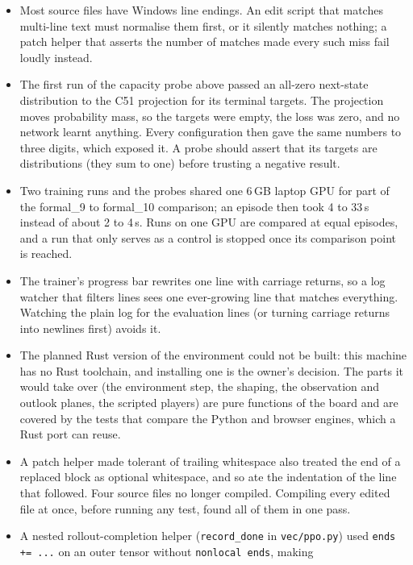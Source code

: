 \begin{itemize}
  \item Most source files have Windows line endings. An edit script that matches multi-line text
        must normalise them first, or it silently matches nothing; a patch helper that asserts the
        number of matches made every such miss fail loudly instead.
  \item The first run of the capacity probe above passed an all-zero next-state distribution to
        the C51 projection for its terminal targets. The projection moves probability mass, so
        the targets were empty, the loss was zero, and no network learnt anything. Every
        configuration then gave the same numbers to three digits, which exposed it. A probe
        should assert that its targets are distributions (they sum to one) before trusting a
        negative result.
  \item Two training runs and the probes shared one 6\,GB laptop GPU for part of the formal\_9 to
        formal\_10 comparison; an episode then took 4 to 33\,s instead of about 2 to 4\,s. Runs on
        one GPU are compared at equal episodes, and a run that only serves as a control is stopped
        once its comparison point is reached.
  \item The trainer's progress bar rewrites one line with carriage returns, so a log watcher that
        filters lines sees one ever-growing line that matches everything. Watching the plain log for
        the evaluation lines (or turning carriage returns into newlines first) avoids it.
  \item The planned Rust version of the environment could not be built: this machine has no Rust
        toolchain, and installing one is the owner's decision. The parts it would take over (the
        environment step, the shaping, the observation and outlook planes, the scripted players)
        are pure functions of the board and are covered by the tests that compare the Python and
        browser engines, which a Rust port can reuse.
  \item A patch helper made tolerant of trailing whitespace also treated the end of a replaced
        block as optional whitespace, and so ate the indentation of the line that followed. Four
        source files no longer compiled. Compiling every edited file at once, before running any
        test, found all of them in one pass.
  \item A nested rollout-completion helper (\texttt{record\_done} in \texttt{vec/ppo.py}) used
        \texttt{ends += ...} on an outer tensor without \texttt{nonlocal ends}, making

\end{itemize}
